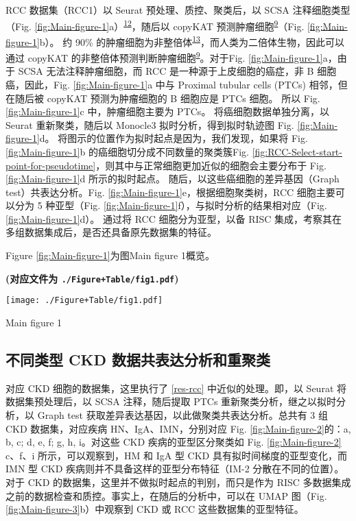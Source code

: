 \documentclass[
]{article}
\begin{document}
RCC 数据集（RCC1）以 Seurat 预处理、质控、聚类后，以 SCSA 注释细胞类型（Fig. \ref{fig:Main-figure-1}a）\textsuperscript{\protect\hyperlink{ref-ScsaACellTyCaoY2020}{12}}，随后以 copyKAT 预测肿瘤细胞\textsuperscript{\protect\hyperlink{ref-DelineatingCopGaoR2021}{9}}（Fig. \ref{fig:Main-figure-1}b）。
约 90\% 的肿瘤细胞为非整倍体\textsuperscript{\protect\hyperlink{ref-CausesAndConsGordon2012}{13}}，而人类为二倍体生物，因此可以通过 copyKAT 的非整倍体预测判断肿瘤细胞\textsuperscript{\protect\hyperlink{ref-DelineatingCopGaoR2021}{9}}。对于Fig. \ref{fig:Main-figure-1}a，由于 SCSA 无法注释肿瘤细胞，而 RCC 是一种源于上皮细胞的癌症，非 B 细胞癌，因此，Fig. \ref{fig:Main-figure-1}a 中与 Proximal tubular cells (PTCs) 相邻，但在随后被 copyKAT 预测为肿瘤细胞的 B 细胞应是 PTCs 细胞。
所以 Fig. \ref{fig:Main-figure-1}c 中，肿瘤细胞主要为 PTCs。
将癌细胞数据单独分离，以 Seurat 重新聚类，随后以 Monocle3 拟时分析，得到拟时轨迹图 Fig. \ref{fig:Main-figure-1}d。
将图示的位置作为拟时起点是因为，我们发现，如果将 Fig. \ref{fig:Main-figure-1}b 的癌细胞切分成不同数量的聚类簇Fig. \ref{fig:RCC-Select-start-point-for-pseudotime}，则其中与正常细胞更加近似的细胞会主要分布于 Fig. \ref{fig:Main-figure-1}d 所示的拟时起点。
随后，以这些癌细胞的差异基因（Graph test）共表达分析。Fig. \ref{fig:Main-figure-1}e，根据细胞聚类树，RCC 细胞主要可以分为 5 种亚型（Fig. \ref{fig:Main-figure-1}f），与拟时分析的结果相对应（Fig. \ref{fig:Main-figure-1}d）。
通过将 RCC 细胞分为亚型，以备 RISC 集成，考察其在多组数据集成后，是否还具备原先数据集的特征。

Figure \ref{fig:Main-figure-1}为图Main figure 1概览。

\textbf{(对应文件为 \texttt{./Figure+Table/fig1.pdf})}

\def\@captype{figure}
\begin{center}
\texttt{[image: ./Figure+Table/fig1.pdf]}
\caption{Main figure 1}\label{fig:Main-figure-1}
\end{center}

\hypertarget{res-ckd}{%
\subsection{不同类型 CKD 数据共表达分析和重聚类}\label{res-ckd}}

对应 CKD 细胞的数据集，这里执行了 \ref{res-rcc} 中近似的处理。即，以 Seurat 将数据集预处理后，以 SCSA 注释，随后提取 PTCs 重新聚类分析，继之以拟时分析，以 Graph test 获取差异表达基因，以此做聚类共表达分析。总共有 3 组 CKD 数据集，对应疾病 HN、IgA、IMN，分别对应 Fig. \ref{fig:Main-figure-2}的：a, b, c; d, e, f; g, h, i。对这些 CKD 疾病的亚型区分聚类如 Fig. \ref{fig:Main-figure-2} c、f、i 所示，可以观察到，HM 和 IgA 型 CKD 具有拟时间梯度的亚型变化，而 IMN 型 CKD 疾病则并不具备这样的亚型分布特征（IM-2 分散在不同的位置）。对于 CKD 的数据集，这里并不做拟时起点的判别，而只是作为 RISC 多数据集成之前的数据检查和质控。事实上，在随后的分析中，可以在 UMAP 图（Fig. \ref{fig:Main-figure-3}b）中观察到 CKD 或 RCC 这些数据集的亚型特征。
\end{document}

